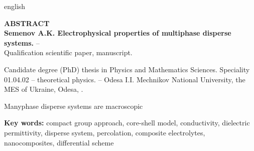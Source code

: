 \begin{otherlanguage*}{english}
\begin{center}
    {\normalfont \textbf{
    		ABSTRACT\\
    	Semenov A.K. Electrophysical properties of multiphase disperse systems.} --\\ Qualification scientific paper, manuscript.}
\end{center}
\vskip 15pt

Candidate degree (PhD) thesis in Physics and Mathematics Sciences. Speciality 01.04.02 -- theoretical physics. -- Odesa I.I. Mechnikov National University, the MES of Ukraine, Odesa, \the\year.

\vskip 15pt

Manyphase disperse systems are macroscopic

\vskip 15pt
\textbf{Key words:} compact group approach, core-shell model, conductivity, dielectric permittivity, disperse system, percolation, composite electrolytes, nanocomposites, differential scheme

\end{otherlanguage*}